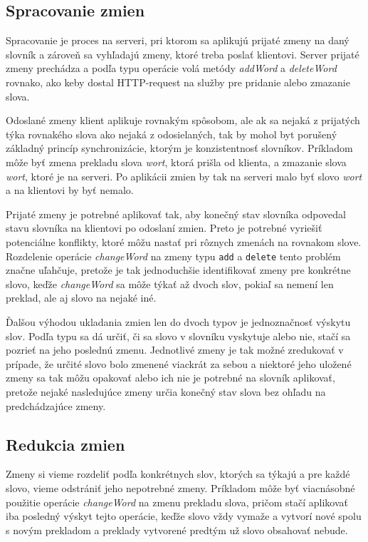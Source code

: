 \documentclass[
  digital, %
  table,   %
  lof,     %
  lot,     %
]{fithesis3}
\begin{document}
\subsection{Spracovanie zmien}
Spracovanie je proces na serveri, pri ktorom sa aplikujú prijaté zmeny na daný slovník a zároveň sa vyhľadajú zmeny, ktoré treba poslať klientovi. Server prijaté zmeny prechádza a podľa typu operácie volá metódy \textit{addWord} a \textit{deleteWord} rovnako, ako keby dostal HTTP-request na služby pre pridanie alebo zmazanie slova.

Odoslané zmeny klient aplikuje rovnakým spôsobom, ale ak sa nejaká z prijatých týka rovnakého slova ako nejaká z odosielaných, tak by mohol byt porušený základný princíp synchronizácie, ktorým je konzistentnosť slovníkov. Príkladom môže byť zmena prekladu slova \textit{wort}, ktorá prišla od klienta, a zmazanie slova \textit{wort}, ktoré je na serveri. Po aplikácii zmien by tak na serveri malo byť slovo \textit{wort} a na klientovi by byť nemalo.

Prijaté zmeny je potrebné aplikovať tak, aby konečný stav slovníka odpovedal stavu slovníka na klientovi po odoslaní zmien. Preto je potrebné vyriešiť potenciálne konflikty, ktoré môžu nastať pri rôznych zmenách na rovnakom slove. Rozdelenie operácie \textit{changeWord} na zmeny typu \texttt{add} a \texttt{delete} tento problém značne uľahčuje, pretože je tak jednoduchšie identifikovať zmeny pre konkrétne slovo, keďže \textit{changeWord} sa môže týkať až dvoch slov, pokiaľ sa nemení len preklad, ale aj slovo na nejaké iné.

Ďalšou výhodou ukladania zmien len do dvoch typov je jednoznačnosť výskytu slov. Podľa typu sa dá určiť, či sa slovo v slovníku vyskytuje alebo nie, stačí sa pozrieť na jeho poslednú zmenu. Jednotlivé zmeny je tak možné zredukovať v prípade, že určité slovo bolo zmenené viackrát za sebou a niektoré jeho uložené zmeny sa tak môžu opakovať alebo ich nie je potrebné na slovník aplikovať, pretože nejaké nasledujúce zmeny určia konečný stav slova bez ohľadu na predchádzajúce zmeny.

\subsection{Redukcia zmien}
Zmeny si vieme rozdeliť podľa konkrétnych slov, ktorých sa týkajú a pre každé slovo, vieme odstrániť jeho nepotrebné zmeny. Príkladom môže byť viacnásobné použitie operácie \textit{changeWord} na zmenu prekladu slova, pričom stačí aplikovať iba posledný výskyt tejto operácie, keďže slovo vždy vymaže a vytvorí nové spolu s novým prekladom a preklady vytvorené predtým už slovo obsahovať nebude.
\end{document}
